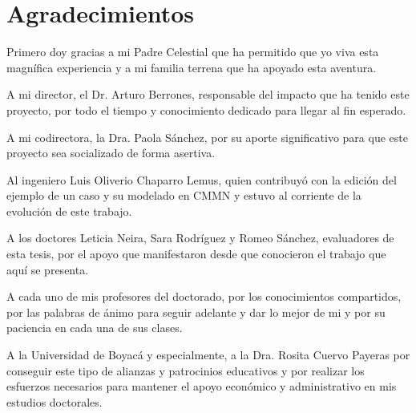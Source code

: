 
\chapter{Agradecimientos}

Primero doy gracias a mi Padre Celestial que ha permitido que yo viva esta magnífica experiencia y a mi familia terrena que ha apoyado esta aventura.

A mi director, el Dr. Arturo Berrones, responsable del impacto que ha tenido este proyecto, por todo el tiempo y conocimiento dedicado para llegar al fin esperado.

A mi codirectora, la Dra. Paola Sánchez, por su aporte significativo para que este proyecto sea socializado de forma asertiva. 

Al ingeniero Luis Oliverio Chaparro Lemus, quien contribuyó con la edición del ejemplo de un caso y su modelado en CMMN y estuvo al corriente de la evolución de este trabajo.

A los doctores Leticia Neira, Sara Rodríguez y Romeo Sánchez, evaluadores de esta tesis, por el apoyo que manifestaron desde que conocieron el trabajo que aquí se presenta.

A cada uno de mis profesores del doctorado, por los conocimientos compartidos, por las palabras de ánimo para seguir adelante y dar lo mejor de mi y por su paciencia en cada una de sus clases.

A la Universidad de Boyacá y especialmente, a la Dra. Rosita Cuervo Payeras por conseguir este tipo de alianzas y patrocinios educativos y por realizar los esfuerzos necesarios para mantener el apoyo económico y administrativo en mis estudios doctorales.
